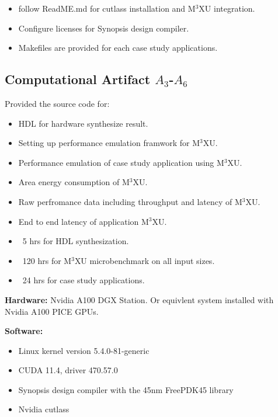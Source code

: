 \documentclass[conference]{IEEEtran}
\newcommand{\MPCMXU}[1]{M$^{3}$XU}
\begin{document}
\artcomp
\begin{itemize}
    \item follow ReadME.md for cutlass installation and \MPCMXU{} integration.
    \item Configure licenses for Synopsis design compiler.
    \item Makefiles are provided for each case study applications.
\end{itemize}

\subsection{Computational Artifact $A_3$-$A_6$}

\artrel
Provided the source code for:
\begin{itemize}
    \item HDL for hardware synthesize result.
    \item Setting up performance emulation framwork for \MPCMXU{}.
    \item Performance emulation of case study application using \MPCMXU{}.
\end{itemize}

\artexp
\begin{itemize}
    \item Area energy consumption of \MPCMXU{}.
    \item Raw perfromance data including throughput and latency of \MPCMXU{}.
    \item End to end latency of application \MPCMXU{}.
\end{itemize}

\arttime
\begin{itemize}
    \item ~5 hrs for HDL synthesization.
    \item ~120 hrs for \MPCMXU{} microbenchmark on all input sizes.
    \item ~24 hrs for case study applications.
\end{itemize}

\artin
\noindent\textbf{Hardware:} Nvidia A100 DGX Station. Or equivlent system installed with Nvidia A100 PICE GPUs.

\noindent\textbf{Software:}
\begin{itemize}
    \item Linux kernel version 5.4.0-81-generic
    \item CUDA 11.4, driver 470.57.0
    \item Synopsis design compiler with the 45nm FreePDK45 library
    \item Nvidia cutlass
\end{itemize}
\end{document}
